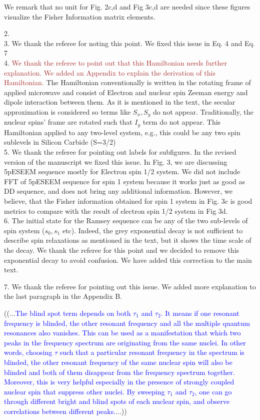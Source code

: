 \documentclass[12pt]{amsart}
\begin{document}
	We remark that no unit for Fig. 2c,d and Fig 3c,d are needed since these figures visualize the Fisher Information matrix elements. 
	
	2. \\
	
	3. We thank the referee for noting this point. We fixed this issue in Eq. 4 and Eq. 7  \\
	
	4. \textcolor{brown}{We thank the referee to point out that this Hamiltonian needs further explanation. We added an Appendix to explain the derivation of this Hamiltonian.} The Hamiltonian conventionally is written in the rotating frame of applied microwave and consist of Electron and nuclear spin Zeeman energy and dipole interaction between them. As it is mentioned in the text, the secular approximation is considered so terms like $S_x, S_y$ do not appear. Traditionally, the nuclear spins' frame are rotated such that $I_y$ term do not appear. This Hamiltonian applied to any two-level system, e.g., this could be any two spin sublevels in Silicon Carbide (S=3/2)\\
	
	5. We thank the referee for pointing out labels for subfigures. In the revised version of the manuscript we fixed this issue. 
	In Fig. 3, we are discussing 5pESEEM sequence mostly for Electron spin 1/2 system. 
	We did not include FFT of 5pESEEM sequence for spin 1 system because it works just as good as DD sequence, and does not bring any additional information. 
	However, we believe, that the Fisher information obtained for spin 1 system in Fig. 3c is good metrics to compare with the result of electron spin 1/2 system in Fig 3d.  \\
	
	6. The initial state for the Ramsey sequence can be any of the two sub-levels of spin system ($s_0, s_1$ etc). Indeed, the grey exponential decay is not sufficient to describe spin relaxations as mentioned in the text, but it shows the time scale of the decay. We thank the referee for this point and we decided to remove this exponential decay to avoid confusion. We have added this correction to the main text.
	 
	7. We thank the referee for pointing out this issue. We added more explanation to the last paragraph in the Appendix B.
	
	((...\textcolor{blue}{The blind spot term depends on both $\tau_1$ and $\tau_2$. It means if one resonant frequency is blinded, the other resonant frequency and all the multiple quantum resonances also vanishes. This can be used as a manifestation that which two peaks in the frequency spectrum are originating from the same nuclei. In other words, choosing $\tau$ such that a particular resonant frequency in the spectrum is blinded, the other resonant frequency of the same nuclear spin will also be blinded and both of them disappear from the frequency spectrum together. Moreover, this is very helpful especially in the presence of strongly coupled nuclear spin that suppress other nuclei. By sweeping $\tau_1$ and $\tau_2$, one can go through different bright and blind spots of each nuclear spin, and observe correlations between different peaks.}...))\\
	
\end{document}
